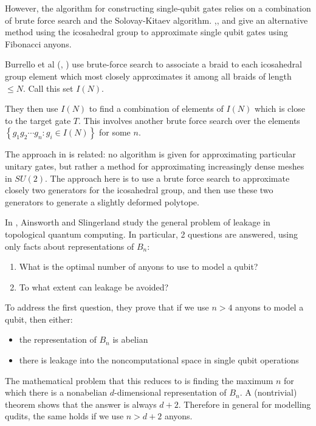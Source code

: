 However, the algorithm for constructing single-qubit gates relies on a
combination of brute force search and the Solovay-Kitaev algorithm.
\cite{Burrello2010},\cite{Burrello2011}, and \cite{Mosseri2008} give an
alternative method using the icosahedral group to approximate single qubit
gates using Fibonacci anyons. 

Burrello et al (\cite{Burrello2010}, \cite{Burrello2011}) use brute-force
search to associate a braid to each icosahedral group element which most
closely approximates it among all braids of length $\leq N$. Call this set
$I(N)$.

They then use $I(N)$ to find a combination of elements of $I(N)$ which is close
to the target gate $T$. This involves another brute force search over the
elements $\left\{ g_1g_2\cdots g_n: g_i \in I(N) \right\}$ for some $n$. 

The approach in \cite{Mosseri2008} is related: no algorithm is given
for approximating particular unitary gates, but rather a method for
approximating increasingly dense meshes in $SU(2)$. The approach here is to
use a brute force search to approximate closely two generators for the
icosahedral group, and then use these two generators to generate a slightly
deformed polytope.

In \cite{Ainsworth2011}, Ainsworth and Slingerland study the general problem of
leakage in topological quantum computing.  In particular, 2 questions are
answered, using only facts about representations of $B_n$:

\begin{enumerate}
\item What is the optimal number of anyons to use to model a qubit?
\item To what extent can leakage be avoided?
\end{enumerate}

To address the first question, they prove that if we use $n > 4$ anyons to
model a qubit, then either:

\begin{itemize}
\item the representation of $B_n$ is abelian
\item there is leakage into the noncomputational space in single qubit operations
\end{itemize}

The mathematical problem that this reduces to is finding the maximum $n$ for
which there is a nonabelian $d$-dimensional representation of $B_n$. A
(nontrivial) theorem shows that the answer is always $d+2$.
Therefore in general for modelling qudits, the same holds if we use $n > d+2$ anyons.

